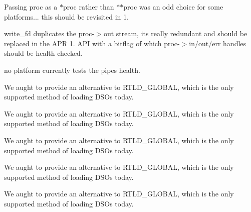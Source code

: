 \begin{DoxyRefList}
Passing proc as a $\ast$proc rather than $\ast$$\ast$proc was an odd choice for some platforms... this should be revisited in 1. 

write\+\_\+fd duplicates the proc-\/$>$out stream, it\textquotesingle{}s really redundant and should be replaced in the A\+PR 1. A\+PI with a bitflag of which proc-\/$>$in/out/err handles should be health checked. 

no platform currently tests the pipes health.  
\item[\label{bug__bug000010}%
\hypertarget{bug__bug000010}{}%
Global \hyperlink{group__apr__user_ga57b4c6adc3e9d22eeaeb32c8faafcc83}{A\+P\+R\+\_\+\+D\+E\+C\+L\+A\+RE} (apr\+\_\+status\+\_\+t) apr\+\_\+uid\+\_\+current(apr\+\_\+uid\+\_\+t $\ast$userid]We aught to provide an alternative to R\+T\+L\+D\+\_\+\+G\+L\+O\+B\+AL, which is the only supported method of loading D\+S\+Os today.  
\item[\label{bug__bug000010}%
\hypertarget{bug__bug000010}{}%
Global \hyperlink{group__apr__user_ga57b4c6adc3e9d22eeaeb32c8faafcc83}{A\+P\+R\+\_\+\+D\+E\+C\+L\+A\+RE} (apr\+\_\+status\+\_\+t) apr\+\_\+uid\+\_\+current(apr\+\_\+uid\+\_\+t $\ast$userid]We aught to provide an alternative to R\+T\+L\+D\+\_\+\+G\+L\+O\+B\+AL, which is the only supported method of loading D\+S\+Os today.  
\item[\label{bug__bug000010}%
\hypertarget{bug__bug000010}{}%
Global \hyperlink{group__apr__user_ga57b4c6adc3e9d22eeaeb32c8faafcc83}{A\+P\+R\+\_\+\+D\+E\+C\+L\+A\+RE} (apr\+\_\+status\+\_\+t) apr\+\_\+uid\+\_\+current(apr\+\_\+uid\+\_\+t $\ast$userid]We aught to provide an alternative to R\+T\+L\+D\+\_\+\+G\+L\+O\+B\+AL, which is the only supported method of loading D\+S\+Os today.  
\item[\label{bug__bug000010}%
\hypertarget{bug__bug000010}{}%
Global \hyperlink{group__apr__user_ga57b4c6adc3e9d22eeaeb32c8faafcc83}{A\+P\+R\+\_\+\+D\+E\+C\+L\+A\+RE} (apr\+\_\+status\+\_\+t) apr\+\_\+uid\+\_\+current(apr\+\_\+uid\+\_\+t $\ast$userid]We aught to provide an alternative to R\+T\+L\+D\+\_\+\+G\+L\+O\+B\+AL, which is the only supported method of loading D\+S\+Os today.  
\item[\label{bug__bug000010}%
\hypertarget{bug__bug000010}{}%
Global \hyperlink{group__apr__user_ga57b4c6adc3e9d22eeaeb32c8faafcc83}{A\+P\+R\+\_\+\+D\+E\+C\+L\+A\+RE} (apr\+\_\+status\+\_\+t) apr\+\_\+uid\+\_\+current(apr\+\_\+uid\+\_\+t $\ast$userid]We aught to provide an alternative to R\+T\+L\+D\+\_\+\+G\+L\+O\+B\+AL, which is the only supported method of loading D\+S\+Os today.  

\end{DoxyRefList}
